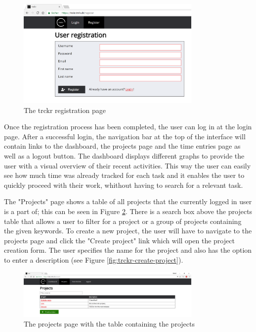 \documentclass[bibliography=totoc, listof=totocnumbered]{scrartcl}
\begin{document}
\begin{figure}[h]
    \includegraphics[width=0.8\textwidth]{trckr-register}
    \caption{The trckr registration page}
    \label{fig:trckr-register}
\end{figure}

Once the registration process has been completed, the user can log in at the
login page. After a successful login, the navigation bar at the top of the
interface will contain links to the dashboard, the projects page and the time
entries page as well as a logout button. The dashboard displays different graphs
to provide the user with a visual overview of their recent activities. This way
the user can easily see how much time was already tracked for each task and it
enables the user to quickly proceed with their work, whithout having to search
for a relevant task.

The "Projects" page shows a table of all projects that the currently logged in
user is a part of; this can be seen in Figure \ref{fig:trckr-projects-table}.
There is a search box above the projects table that allows a user to filter for
a project or a group of projects containing the given keywords. To create a new
project, the user will have to navigate to the projects page and click the
"Create project" link which will open the project creation form. The user
specifies the name for the project and also has the option to enter a
description (see Figure \ref{fig:trckr-create-project}).

\begin{figure}[h]
	\includegraphics[width=0.8\textwidth]{trckr-projects-table}
	\caption{The projects page with the table containing the projects}
	\label{fig:trckr-projects-table}
\end{figure}
\end{document}
